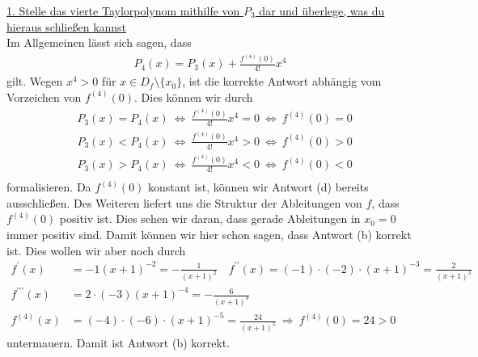 \underline{1. Stelle das vierte Taylorpolynom mithilfe von $ P_3 $ dar und überlege, was du hieraus schließen kannst}\\
Im Allgemeinen lässt sich sagen, dass
\begin{align*}
P_4(x) = P_3(x) + \frac{f^{(4)}(0)}{4!} x^4
\end{align*}
gilt. Wegen $ x^4  > 0 $ für $ x \in D_f \setminus \{ x_0\} $, ist die korrekte Antwort abhängig vom Vorzeichen von $ f^{(4)}(0) $.
Dies können wir durch 
\begin{align*}
&P_3(x) = P_4(x)
\ \Leftrightarrow \
 \frac{f^{(4)}(0)}{4!} x^4 = 0
\ \Leftrightarrow \
f^{(4)}(0) = 0\\
&P_3(x) < P_4(x)
\ \Leftrightarrow \
 \frac{f^{(4)}(0)}{4!} x^4 > 0
\ \Leftrightarrow \
f^{(4)}(0) > 0\\
&P_3(x) > P_4(x)
\ \Leftrightarrow \
 \frac{f^{(4)}(0)}{4!} x^4 <0
\ \Leftrightarrow \
f^{(4)}(0) < 0\\
\end{align*}
formalisieren. Da $ f^{(4)}(0) $ konstant ist, können wir Antwort (d) bereits ausschließen.
Des Weiteren liefert uns die Struktur der Ableitungen von $ f $, dass $ f^{(4)}(0) $ positiv ist. Dies sehen wir daran, dass gerade Ableitungen in $ x_0 = 0 $ immer positiv sind. Damit können wir hier schon sagen, dass Antwort (b) korrekt ist.
Dies wollen wir aber noch durch
\begin{align*}
f^\prime(x) &=
-1 (x+1)^{-2}
=
 - \frac{1}{(x+1)^2} \quad
f^{\prime \prime}(x) = 
(-1) \cdot (-2)  \cdot (x + 1 )^{-3}
=
\frac{2}{(x+1)^3}\\
f^{\prime \prime \prime}(x) &= 
2 \cdot(-3) (x+1)^{-4}
=
- \frac{6}{(x+1)^4}\\
f^{(4)}(x) &= 
(-4) \cdot (-6) \cdot (x+1)^{-5}
=
\frac{24}{(x+1)^5}
\ \Rightarrow \
f^{(4)}(0) = 24 > 0
\end{align*}
untermauern. Damit ist Antwort (b) korrekt.

\newpage
